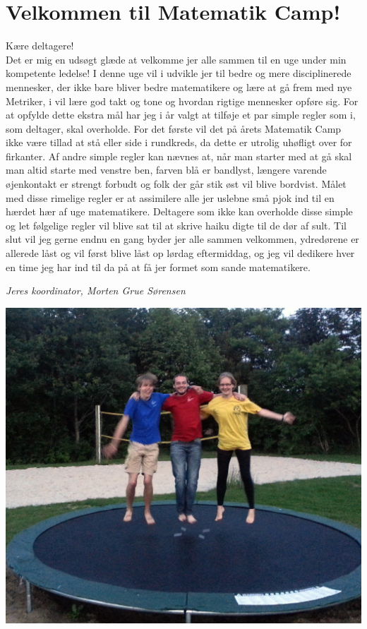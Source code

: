 \begin{minipage}[b]{0.95\linewidth}
\begin{minipage}[t]{0.47\textwidth}
\section*{Velkommen til Matematik Camp!}
Kære deltagere!\\
Det er mig en udsøgt glæde at velkomme jer alle sammen til en uge under min kompetente ledelse! I denne uge vil i udvikle jer til bedre og mere disciplinerede mennesker, der ikke bare bliver bedre matematikere og lære at gå frem med nye Metriker, i vil lære god takt og tone og hvordan rigtige mennesker opføre sig. For at opfylde dette ekstra mål har jeg i år valgt at tilføje et par simple regler som i, som deltager, skal overholde. For det første vil det på årets Matematik Camp ikke være tillad at stå eller side i rundkreds, da dette er utrolig uhøfligt over for firkanter. Af andre simple regler kan nævnes at, når man starter med at gå skal man altid starte med venstre ben, farven blå er bandlyst, længere varende øjenkontakt er strengt forbudt og folk der går stik øst vil blive bordvist. Målet med disse rimelige regler er at assimilere alle jer uslebne små pjok ind til en hærdet hær af uge matematikere. Deltagere som ikke kan overholde disse simple og let følgelige regler vil blive sat til at skrive haiku digte til de dør af sult. Til slut vil jeg gerne endnu en gang byder jer alle sammen velkommen, ydredørene er allerede låst og vil først blive låst op lørdag eftermiddag, og jeg vil dedikere hver en time jeg har ind til da på at få jer formet som sande matematikere.

 
{\flushright\emph{Jeres koordinator, Morten Grue Sørensen}}

\begin{center}
\includegraphics[width=\linewidth]{koordinatorer2.jpg}
\end{center}

\end{minipage}
\end{minipage}

